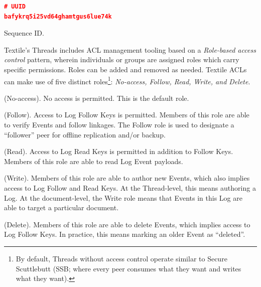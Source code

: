 \documentclass{textile}
\begin{document}
\begin{example}[!b]
\centering
\begin{lstlisting}[language=json,firstnumber=1]
# UUID
bafykrq5i25vd64ghamtgus6lue74k
\end{lstlisting}
  \caption{Sequence ID.}
  \label{ex:SequenceID}
\end{example}

Textile's Threads includes ACL management tooling based on a \emph{Role-based access control} \cite{sandhuRolebasedAccessControl1996} pattern, wherein individuals or groups are assigned roles which carry specific permissions. Roles can be added and removed as needed. Textile ACLs can make use of five distinct roles\footnote{By default, Threads without access control operate similar to Secure Scuttlebutt (SSB; where every peer consumes what they want and writes what they want).}: \emph{No-access, Follow, Read, Write, and Delete}.

\begin{definition}
(No-access). No access is permitted. This is the default role.
\end{definition}

\begin{definition}
(Follow). Access to Log Follow Keys is permitted. Members of this role are able to verify Events and follow linkages. The Follow role is used to designate a ``follower'' peer for offline replication and/or backup.
\end{definition}

\begin{definition}
(Read). Access to Log Read Keys is permitted in addition to Follow Keys. Members of this role are able to read Log Event payloads.
\end{definition}

\begin{definition}
(Write). Members of this role are able to author new Events, which also implies access to Log Follow and Read Keys. At the Thread-level, this means authoring a Log. At the document-level, the Write role means that Events in this Log are able to target a particular document.
\end{definition}

\begin{definition}
(Delete). Members of this role are able to delete Events, which implies access to Log Follow Keys. In practice, this means marking an older Event as ``deleted''.
\end{definition}
\end{document}
